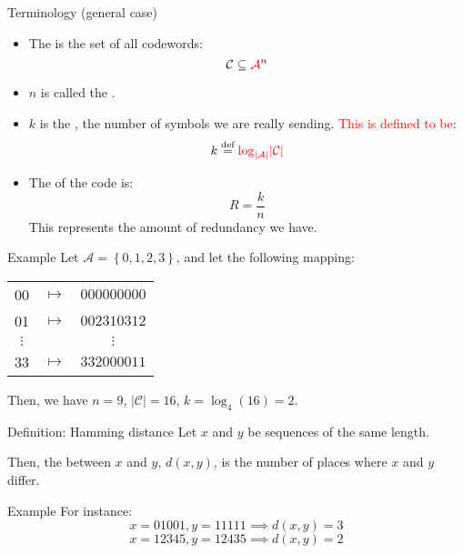 \documentclass[a4paper]{article}
\begin{document}
\begin{parag}{Terminology (general case)}
    \begin{itemize}[left=0pt]
        \item The  is the set of all codewords: 
        \[\mathcal{C} \subseteq {\color{red}\mathcal{A}}^n\]
        \item $n$ is called the .
        \item $k$ is the , the number of symbols we are really sending. \textcolor{red}{This is defined to be}:
        \[k \over{=}{def}  {\color{red}\log_{\left|\mathcal{A}\right|} \left|\mathcal{C}\right|}\]
        \item The  of the code is: 
        \[R = \frac{k}{n}\]
        This represents the amount of redundancy we have.
    \end{itemize}
\end{parag}

\begin{parag}{Example}
    Let $\mathcal{A} = \left\{0, 1, 2, 3\right\}$, and let the following mapping: 
    \begin{center}
    \begin{tabular}{ccc}
        00 & $\mapsto$ &  $000000000$  \\
        01 & $\mapsto$ & $002310312$ \\
        $\vdots$ & & $\vdots$ \\
        33 & $\mapsto$ & $332000011$
    \end{tabular}
    \end{center}
    
    Then, we have $n = 9$, $\left|\mathcal{C}\right| = 16$, $k = \log_4\left(16\right) = 2$.
\end{parag}

\begin{parag}{Definition: Hamming distance}
    Let $x$ and $y$ be sequences of the same length.

    Then, the  between $x$ and $y$, $d\left(x, y\right)$, is the number of places where $x$ and $y$ differ.


    \begin{subparag}{Example}
        For instance: 
        \[x = 01001, y = 11111 \implies d\left(x, y\right) = 3\] 
        \[x = 12345, y = 12435 \implies d\left(x, y\right) = 2\]
    \end{subparag}
\end{parag}
    
\end{document}
